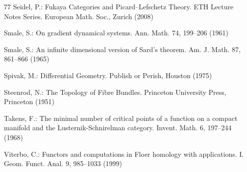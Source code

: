 \begin{thebibliography}{77}
 Seidel, P.: Fukaya Categories and Picard–Lefschetz Theory. ETH Lecture Notes Series. European Math. Soc., Zurich (2008)

 Smale, S.: On gradient dynamical systems. Ann. Math. 74, 199–206 (1961)

 Smale, S.: An infinite dimensional version of Sard’s theorem. Am. J. Math. 87, 861–866 (1965)

 Spivak, M.: Differential Geometry. Publish or Perish, Houston (1975)

 Steenrod, N.: The Topology of Fibre Bundles. Princeton University Press, Princeton (1951)

 Takens, F.: The minimal number of critical points of a function on a compact manifold and the Lusternik-Schnirelman category. Invent. Math. 6, 197–244 (1968)

 Viterbo, C.: Functors and computations in Floer homology with applications. I. Geom. Funct. Anal. 9, 985–1033 (1999)

\end{thebibliography}
